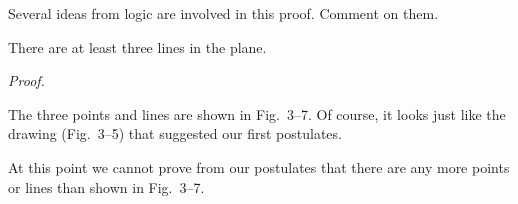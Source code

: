 \documentclass[11pt]{book}
\theoremstyle{bkplain}
\begin{document}
\begin{remark}
Several ideas from logic are involved in this proof. Comment on them.
\end{remark}

\begin{theorem}
There are at least three lines in the plane.
\end{theorem}

\FIGIIISIXSEVEN

\noindent\emph{Proof.}
\begin{steps}
\end{steps}

The three points and lines are shown in Fig.~3--7. Of course, it looks just like
the drawing (Fig.~3--5) that suggested our first postulates.

\begin{remark}
At this point we cannot prove from our postulates that there are any more points
or lines than shown in Fig.~3--7.
\end{remark}
\end{document}
